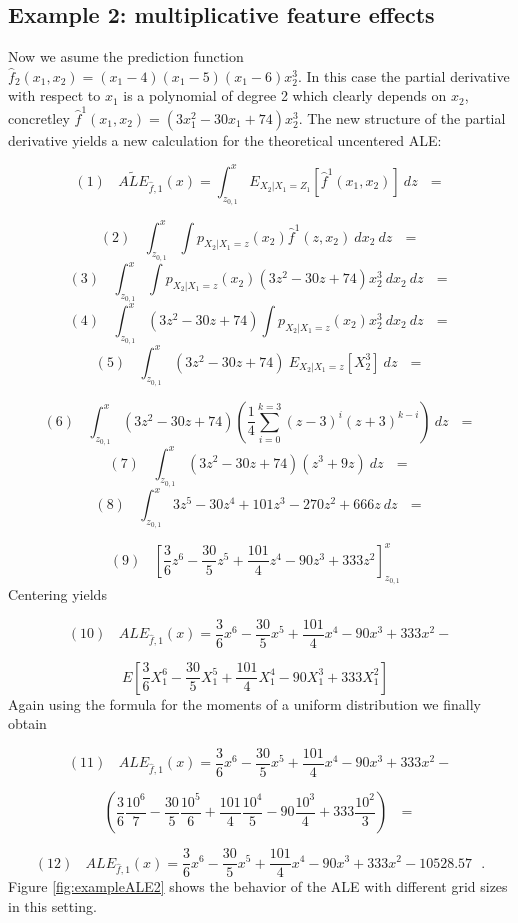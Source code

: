 \documentclass[]{krantz}
\begin{document}
\subsection{Example 2: multiplicative feature
effects}\label{example-2-multiplicative-feature-effects}

Now we asume the prediction function
\(\hat{f}_2 (x_1, x_2) = (x_1-4)(x_1-5)(x_1-6)x_2^3\). In this case the
partial derivative with respect to \(x_1\) is a polynomial of degree 2
which clearly depends on \(x_2\), concretley
\(\hat{f}^1(x_1,x_2) = (3x_1^2 -30x_1 +74)x_2^3\). The new structure of
the partial derivative yields a new calculation for the theoretical
uncentered ALE:

\[(1)~~~~\widetilde{ALE}_{\hat{f},1}(x) = \int_{z_{0,1}}^x E_{X_2\vert X_1= Z_1}[\hat{f}^1(x_1,x_2)]~dz~~~=\]

\[(2)~~~~ \int_{z_{0,1}}^x \int p_{X_2\vert X_1=z}(x_2)\hat{f}^1(z,x_2)~dx_2~dz~~~=\]
\[(3)~~~~ \int_{z_{0,1}}^x \int p_{X_2\vert X_1=z}(x_2)(3z^2 -30z +74)x_2^3~dx_2~dz~~~=\]
\[(4)~~~~ \int_{z_{0,1}}^x (3z^2 -30z +74)\int p_{X_2\vert X_1=z}(x_2)x_2^3~dx_2~dz~~~=\]
\[(5)~~~~ \int_{z_{0,1}}^x (3z^2 -30z +74)~E_{X_2\vert X_1 = z}[X_2^3]~dz~~~=\]

\[(6)~~~~ \int_{z_{0,1}}^x (3z^2 -30z +74)(\frac{1}{4}\sum_{i=0}^{k=3}(z-3)^i(z+3)^{k-i})~dz~~~=\]
\[(7)~~~~ \int_{z_{0,1}}^x (3z^2 -30z +74)(z^3 + 9z)~dz~~~=\]
\[(8)~~~~ \int_{z_{0,1}}^x 3 z^5 - 30 z^4 + 101 z^3 - 270 z^2 + 666 z ~dz~~~=\]

\[(9)~~~~ [ \frac{3}{6} z^6 - \frac{30}{5}z^5 + \frac{101}{4}z^4 - 90 z^3 + 333 z^2]_{z_{0,1}}^x~~~\]
Centering yields

\[(10)~~~~ALE_{\hat{f},1}(x) =  \frac{3}{6} x^6 - \frac{30}{5}x^5 + \frac{101}{4}x^4 - 90 x^3 + 333 x^2 - \]

\[E[ \frac{3}{6} X_1^6 - \frac{30}{5}X_1^5 + \frac{101}{4}X_1^4 - 90 X_1^3 + 333 X_1^2] ~~~\]
Again using the formula for the moments of a uniform distribution we
finally obtain

\[(11)~~~~ALE_{\hat{f},1}(x) =  \frac{3}{6} x^6 - \frac{30}{5}x^5 + \frac{101}{4}x^4 - 90 x^3 + 333 x^2 - \]

\[(\frac{3}{6}\frac{10^6}{7}-\frac{30}{5}\frac{10^5}{6} +\frac{101}{4}\frac{10^4}{5}-90\frac{10^3}{4}+333\frac{10^2}{3}) ~~~=\]

\[(12)~~~~ALE_{\hat{f},1}(x) =  \frac{3}{6} x^6 - \frac{30}{5}x^5 + \frac{101}{4}x^4 - 90 x^3 + 333 x^2 - 10528.57~~~.\]
Figure \ref{fig:exampleALE2} shows the behavior of the ALE with
different grid sizes in this setting.
\end{document}

